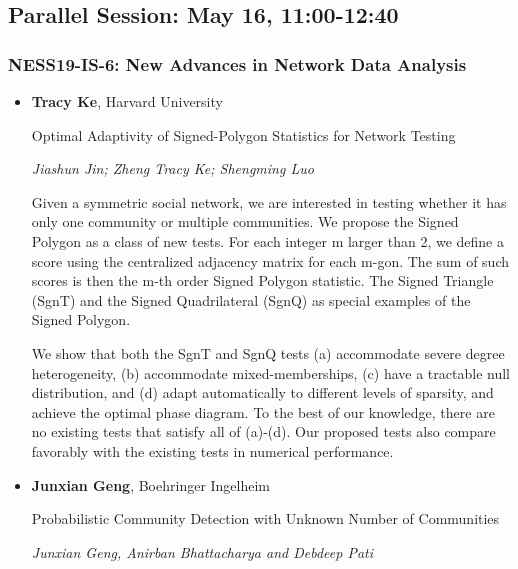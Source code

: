 
\subsection*{Parallel Session: May 16, 11:00-12:40}

\subsubsection*{NESS19-IS-6: New Advances in Network Data Analysis}

\begin{itemize}
\item \textbf{Tracy Ke}, Harvard University

Optimal Adaptivity of Signed-Polygon Statistics for Network Testing

\emph{\footnotesize Jiashun Jin; Zheng Tracy Ke; Shengming Luo}

Given a symmetric social network, we are interested in testing whether it has only one community or multiple  communities.  We propose the Signed Polygon as a class of new tests. For each integer m larger than 2, we define a score using the centralized adjacency matrix for each m-gon. The sum of such scores is then the m-th order Signed Polygon statistic. The Signed Triangle (SgnT) and the Signed Quadrilateral (SgnQ) as special examples of the Signed Polygon.  


We show that both the SgnT and SgnQ tests (a) accommodate severe degree heterogeneity, (b) accommodate mixed-memberships, (c) have a tractable null distribution, and (d)  adapt automatically to different levels of sparsity, and achieve the optimal phase diagram. To the best of our knowledge, there are no existing tests that satisfy all of (a)-(d). Our proposed tests also compare favorably with the existing tests in numerical performance.  


\item \textbf{Junxian Geng}, Boehringer Ingelheim

Probabilistic Community Detection with Unknown Number of Communities

\emph{\footnotesize Junxian Geng, Anirban Bhattacharya and Debdeep Pati}


\end{itemize}

